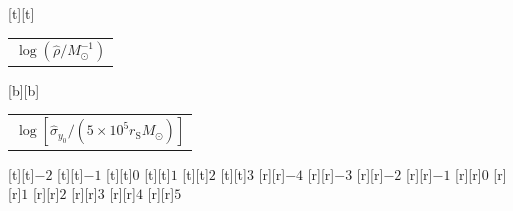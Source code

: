 %    
%
%
\begin{psfrags}%
\psfragscanon%
%
[t][t]{\color[rgb]{0,0,0}\setlength{\tabcolsep}{0pt}\begin{tabular}{c}{\Large$\log\left(\hat{\rho}/M_\odot^{-1}\right)$}\end{tabular}}%
[b][b]{\color[rgb]{0,0,0}\setlength{\tabcolsep}{0pt}\begin{tabular}{c}{\Large$\log\left[\hat{\sigma}_{y_0}/\left(5 \times 10^5 r_\mathrm{S} M_\odot\right)\right]$}\end{tabular}}%
%
[t][t]{$-2$}%
[t][t]{$-1$}%
[t][t]{$0$}%
[t][t]{$1$}%
[t][t]{$2$}%
[t][t]{$3$}%
%
[r][r]{$-4$}%
[r][r]{$-3$}%
[r][r]{$-2$}%
[r][r]{$-1$}%
[r][r]{$0$}%
[r][r]{$1$}%
[r][r]{$2$}%
[r][r]{$3$}%
[r][r]{$4$}%
[r][r]{$5$}%
%
%
\end{psfrags}%
%
